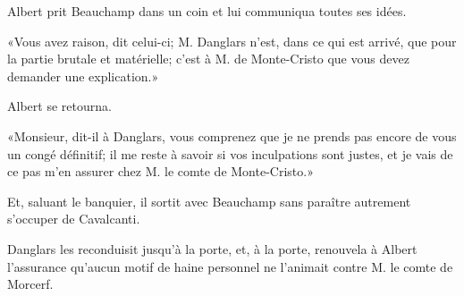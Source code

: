 Albert prit Beauchamp dans un coin et lui communiqua toutes ses idées. 

«Vous avez raison, dit celui-ci; M. Danglars n'est, dans ce qui est arrivé, que pour la partie brutale et matérielle; c'est à M. de Monte-Cristo que vous devez demander une explication.» 

Albert se retourna. 

«Monsieur, dit-il à Danglars, vous comprenez que je ne prends pas encore de vous un congé définitif; il me reste à savoir si vos inculpations sont justes, et je vais de ce pas m'en assurer chez M. le comte de Monte-Cristo.» 

Et, saluant le banquier, il sortit avec Beauchamp sans paraître autrement s'occuper de Cavalcanti. 

Danglars les reconduisit jusqu'à la porte, et, à la porte, renouvela à Albert l'assurance qu'aucun motif de haine personnel ne l'animait contre M. le comte de Morcerf. 